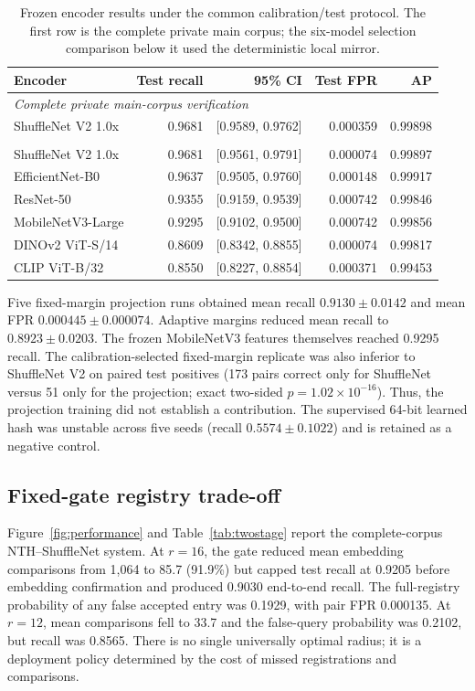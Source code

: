 \documentclass[12pt]{article}
\begin{document}
\begin{table}[ht]
\centering
\caption{Frozen encoder results under the common calibration/test protocol. The first row is the complete private main corpus; the six-model selection comparison below it used the deterministic local mirror.}
\label{tab:deep}
\begin{tabular}{lrrrr}
\toprule
Encoder & Test recall & 95\% CI & Test FPR & AP\\
\midrule
\multicolumn{5}{l}{\emph{Complete private main-corpus verification}}\\
ShuffleNet V2 1.0x & 0.9681 & [0.9589, 0.9762] & 0.000359 & 0.99898\\
\addlinespace
\multicolumn{5}{l}{\emph{Six-encoder comparison on deterministic local mirror}}\\
ShuffleNet V2 1.0x & 0.9681 & [0.9561, 0.9791] & 0.000074 & 0.99897\\
EfficientNet-B0 & 0.9637 & [0.9505, 0.9760] & 0.000148 & 0.99917\\
ResNet-50 & 0.9355 & [0.9159, 0.9539] & 0.000742 & 0.99846\\
MobileNetV3-Large & 0.9295 & [0.9102, 0.9500] & 0.000742 & 0.99856\\
DINOv2 ViT-S/14 & 0.8609 & [0.8342, 0.8855] & 0.000074 & 0.99817\\
CLIP ViT-B/32 & 0.8550 & [0.8227, 0.8854] & 0.000371 & 0.99453\\
\bottomrule
\end{tabular}
\end{table}

Five fixed-margin projection runs obtained mean recall $0.9130\pm0.0142$ and mean FPR $0.000445\pm0.000074$. Adaptive margins reduced mean recall to $0.8923\pm0.0203$. The frozen MobileNetV3 features themselves reached 0.9295 recall. The calibration-selected fixed-margin replicate was also inferior to ShuffleNet V2 on paired test positives (173 pairs correct only for ShuffleNet versus 51 only for the projection; exact two-sided $p=1.02\times10^{-16}$). Thus, the projection training did not establish a contribution. The supervised 64-bit learned hash was unstable across five seeds (recall $0.5574\pm0.1022$) and is retained as a negative control.

\subsection{Fixed-gate registry trade-off}

Figure~\ref{fig:performance} and Table~\ref{tab:twostage} report the complete-corpus NTH--ShuffleNet system. At $r=16$, the gate reduced mean embedding comparisons from 1,064 to 85.7 (91.9\%) but capped test recall at 0.9205 before embedding confirmation and produced 0.9030 end-to-end recall. The full-registry probability of any false accepted entry was 0.1929, with pair FPR 0.000135. At $r=12$, mean comparisons fell to 33.7 and the false-query probability was 0.2102, but recall was 0.8565. There is no single universally optimal radius; it is a deployment policy determined by the cost of missed registrations and comparisons.
\end{document}
